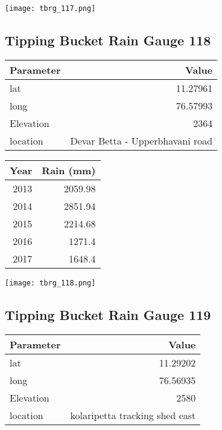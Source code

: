 \documentclass[a4paper]{article}
\begin{document}
\begin{center}
\texttt{[image: tbrg\_117.png]}
\end{center}

\newpage

\subsection*{Tipping Bucket Rain Gauge 118}
\label{sec:org20f0c73}

\begin{center}
\begin{tabular}{lr}
Parameter & Value\\
\hline
lat & 11.27961\\
long & 76.57993\\
Elevation & 2364\\
location & Devar Betta - Upperbhavani road\\
\end{tabular}
\end{center}

\begin{center}
\begin{tabular}{rr}
Year & Rain (mm)\\
\hline
2013 & 2059.98\\
2014 & 2851.94\\
2015 & 2214.68\\
2016 & 1271.4\\
2017 & 1648.4\\
\end{tabular}
\end{center}

\begin{center}
\texttt{[image: tbrg\_118.png]}
\end{center}

\newpage

\subsection*{Tipping Bucket Rain Gauge 119}
\label{sec:org8d63e00}

\begin{center}
\begin{tabular}{lr}
Parameter & Value\\
\hline
lat & 11.29202\\
long & 76.56935\\
Elevation & 2580\\
location & kolaripetta tracking shed east\\
\end{tabular}
\end{center}
\end{document}
